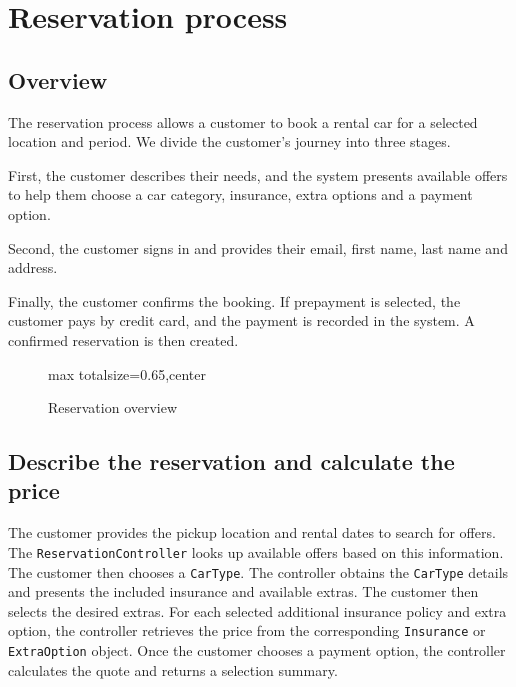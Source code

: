 \documentclass[12pt,a4paper]{report}
\begin{document}
\section{Reservation process}
\subsection{Overview}
The reservation process allows a customer to book a rental car for a selected location and period.
We divide the customer's journey into three stages.


First, the customer describes their needs, and the system presents available offers to
help them choose a car category, insurance, extra options and a payment option.

Second, the customer signs in and provides their email, first name, last name and address.

Finally, the customer confirms the booking. If prepayment is selected, the customer pays by credit card,
and the payment is recorded in the system. A confirmed reservation is then created.

\begin{figure}[H]
    \centering
    \begin{adjustbox}{max totalsize={\linewidth}{0.65\textheight},center}
    \end{adjustbox}
    \caption{Reservation overview}
    \label{fig:reservation-overview}
\end{figure}

\clearpage
\subsection{Describe the reservation and calculate the price}
The customer provides the pickup location and rental dates to search for offers.
The \texttt{ReservationController} looks up available offers based on this information.
The customer then chooses a \texttt{CarType}.
The controller obtains the \texttt{CarType} details and presents the included insurance and available extras.
The customer then selects the desired extras.
For each selected additional insurance policy and extra option, the controller retrieves the price from the corresponding \texttt{Insurance} or \texttt{ExtraOption} object.
Once the customer chooses a payment option, the controller calculates the quote and returns a selection summary.
\end{document}
